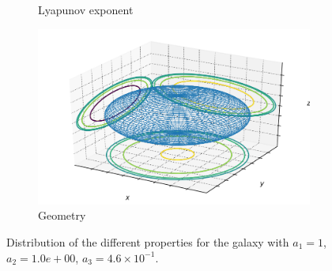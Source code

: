 \begin{figure}[h]
\begin{subfigure}[t]{0.4\textwidth}
        \caption{Lyapunov exponent}
    \end{subfigure}
    \begin{subfigure}[t]{0.4\textwidth}
        \includegraphics[width=\textwidth]{"../Files/Week 13/images/20_ellipsoid"}
        \caption{Geometry}
    \end{subfigure}
    \caption{Distribution of the different properties for the galaxy with $a_1 = 1$, $a_2 = 1.0e+00$, $a_3 = 4.6\times10^{-1}$.}
\end{figure}



